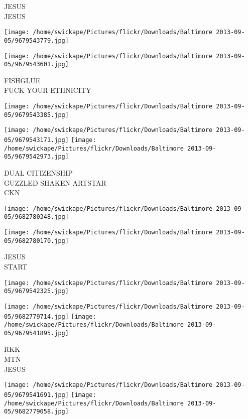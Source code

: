 \documentclass[10pt,letterpaper]{article}
\begin{document}
JESUS\\
JESUS
\pagebreak

\texttt{[image: /home/swickape/Pictures/flickr/Downloads/Baltimore 2013-09-05/9679543779.jpg]}

\vspace{0.25in}
\texttt{[image: /home/swickape/Pictures/flickr/Downloads/Baltimore 2013-09-05/9679543601.jpg]}

FISHGLUE\\
FUCK YOUR ETHNICITY
\pagebreak

\texttt{[image: /home/swickape/Pictures/flickr/Downloads/Baltimore 2013-09-05/9679543385.jpg]}

\vspace{0.25in}
\texttt{[image: /home/swickape/Pictures/flickr/Downloads/Baltimore 2013-09-05/9679543171.jpg]}
\texttt{[image: /home/swickape/Pictures/flickr/Downloads/Baltimore 2013-09-05/9679542973.jpg]}

DUAL CITIZENSHIP\\
GUZZLED SHAKEN ARTSTAR\\
CKN
\pagebreak

\texttt{[image: /home/swickape/Pictures/flickr/Downloads/Baltimore 2013-09-05/9682780348.jpg]}

\vspace{0.25in}
\texttt{[image: /home/swickape/Pictures/flickr/Downloads/Baltimore 2013-09-05/9682780170.jpg]}

JESUS\\
START
\pagebreak

\texttt{[image: /home/swickape/Pictures/flickr/Downloads/Baltimore 2013-09-05/9679542325.jpg]}

\vspace{0.25in}
\texttt{[image: /home/swickape/Pictures/flickr/Downloads/Baltimore 2013-09-05/9682779714.jpg]}
\texttt{[image: /home/swickape/Pictures/flickr/Downloads/Baltimore 2013-09-05/9679541895.jpg]}

RKK\\
MTN\\
JESUS
\pagebreak

\texttt{[image: /home/swickape/Pictures/flickr/Downloads/Baltimore 2013-09-05/9679541691.jpg]}
\texttt{[image: /home/swickape/Pictures/flickr/Downloads/Baltimore 2013-09-05/9682779058.jpg]}
\end{document}
